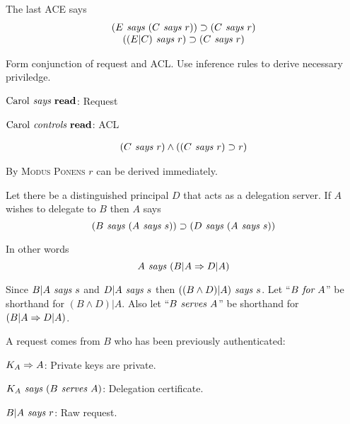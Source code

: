 The last ACE says
$$\begin{array}{c}
  (E \textit{ says } (C \textit{ says } r)) \supset (C \textit{ says } r) \\
  ((E|C) \textit{ says } r) \supset (C \textit{ says } r)
\end{array}$$

\stopslide



Form conjunction of request and ACL. Use inference rules to derive
necessary priviledge.

\begin{citemize}
  \item $\text{Carol} \textit{ says } \mathrm{\bf read}$: Request
  \item $\text{Carol} \textit{ controls } \mathrm{\bf read}$: ACL
\end{citemize}

$$\begin{array}{c}
  (C \textit{ says } r) \wedge ((C \textit{ says } r) \supset r)
\end{array}$$

By \textsc{Modus Ponens} $r$ can be derived immediately.

\stopslide



Let there be a distinguished principal $D$ that acts as a delegation
server. If $A$ wishes to delegate to $B$ then $A$ says
$$(B \textit{ says } (A \textit{ says } s)) \supset (D \textit{ says } (A \textit{ says } s))$$

In other words
$$A \textit{ says } (B|A \Rightarrow D|A)$$

Since $B|A \textit{ says } s$ and $D|A \textit{ says } s$ then $((B \wedge D)|A) \textit{ says } s$.
Let ``$B \textit{ for } A$'' be shorthand for $(B \wedge D)|A$. Also let ``$B
\textit{ serves } A$'' be shorthand for $(B|A \Rightarrow D|A)$.

\stopslide



A request comes from $B$ who has been previously authenticated:
\begin{citemize}
  \item $K_A \Rightarrow A$: Private keys are private.
  \item $K_A \textit{ says } (B \textit{ serves } A)$: Delegation certificate.
  \item $B|A \textit{ says } r$: Raw request.
\end{citemize}


